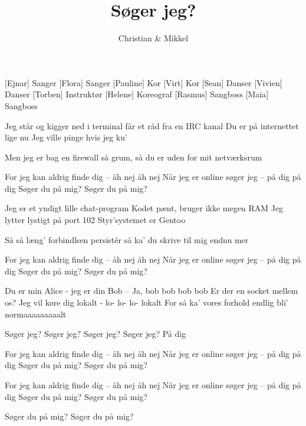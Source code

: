 \documentclass[a4paper,11pt]{article}
\title{Søger jeg?}
\author{Christian \& Mikkel}
\begin{document}
\maketitle

\begin{roles}
  [Ejnar] Sanger
  [Flora] Sanger
  [Pauline] Kor
  [Virt] Kor
  [Sean] Danser
  [Vivien] Danser
  [Torben] Instruktør
  [Helene] Koreograf
  [Rasmus] Sangboss
  [Maia] Sangboss
\end{roles}

\begin{song}

%
Jeg står og kigger ned i terminal
får et råd fra en IRC kanal
Du er på internettet lige nu
Jeg ville pinge hvis jeg ku’

 Men jeg er bag en firewall så grum, så du er uden for mit netværksrum

%
For jeg kan aldrig finde dig – åh nej åh nej
Når jeg er online søger jeg – på dig på dig
Søger du på mig?
Søger du på mig?

%
Jeg er et yndigt lille chat-program
Kodet pænt, bruger ikke megen RAM
Jeg lytter lystigt på port 102
Styr’systemet er Gentoo

 Så så læng’ forbindlsen persistér så ka’ du skrive til mig endnu mer

For jeg kan aldrig finde dig – åh nej åh nej
Når jeg er online søger jeg – på dig på dig
Søger du på mig?
Søger du på mig?

 Du er min Alice - jeg er din Bob –
 Ja, bob bob bob bob
 Er der en socket mellem os?
 Jeg vil køre dig lokalt -
 lo- lo- lo- lokalt
 For så ka’ vores forhold endlig bli’
 normaaaaaaaaalt

%
Søger jeg? Søger jeg?
Søger jeg? Søger jeg?
 På dig

%
For jeg kan aldrig finde dig – åh nej åh nej
Når jeg er online søger jeg – på dig på dig
Søger du på mig?
Søger du på mig?

For jeg kan aldrig finde dig – åh nej åh nej
Når jeg er online søger jeg – på dig på dig
Søger du på mig?
Søger du på mig?

Søger du på mig?
Søger du på mig?

\end{song}
\end{document}
